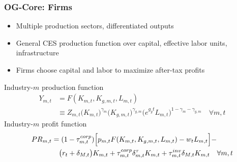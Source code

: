 \documentclass{beamer}
\begin{document}
  \begin{frame}
    \frametitle{OG-Core: Firms}
    \begin{itemize}
      \item Multiple production sectors, differentiated outputs
      \vspace{1mm}
      \item General CES production function over capital, effective labor units, infrastructure
      \vspace{1mm}
      \item Firms choose capital and labor to maximize after-tax profits
    \end{itemize}
    Industry-$m$ production function
    \begin{equation*}
      \begin{split}
        Y_{m,t} &= F(K_{m,t}, K_{g,m,t}, L_{m,t}) \\
        &\equiv Z_{m,t}\bigl(K_{m,t}\bigr)^{\gamma_m}\bigl(K_{g,m,t}\bigr)^{\gamma_{g,m}}\bigl(e^{g_y t}L_{m,t}\bigr)^{1-\gamma_m -\gamma_{g,m}} \quad\forall m,t
      \end{split}
    \end{equation*}
    Industry-$m$ profit function
    \begin{equation*}
      \begin{split}
        PR_{m,t} &= (1 - \tau^{corp}_{m,t})\Bigl[p_{m,t}F(K_{m,t},K_{g,m,t},L_{m,t}) - w_t L_{m,t}\Bigr] - \\
        &\quad \bigl(r_t + \delta_{M,t}\bigr)K_{m,t} + \tau^{corp}_{m,t}\delta^\tau_{m,t}K_{m,t} + \tau^{inv}_{m,t}\delta_{M,t}K_{m,t} \quad\forall m,t
      \end{split}
    \end{equation*}

  \end{frame}
\end{document}
